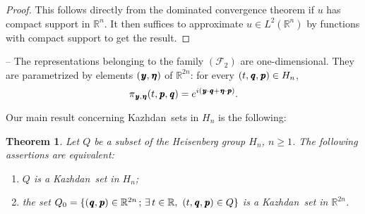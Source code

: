 \documentclass[11pt,english,a4paper]{smfart}
\numberwithin{equation}{section}
\newtheorem{theorem}{Theorem}[section]
\theoremstyle{definition}
\begin{document}
\begin{proof}
 This follows directly from the dominated convergence theorem if $u$ has compact support in ${\ensuremath{\mathbb R}}^{n}$. It then suffices to approximate $u\in L^{2}({\ensuremath{\mathbb R}}^{n})$ by functions with compact support to get the result.
\end{proof}
\par\smallskip 
-- The representations belonging to the family $(\mathcal{F}_{2})$ are one-dimensional. They are parametrized by elements $({\mkern 1.5 mu\pmb{y}},{\mkern 1.5 mu\pmb{\eta}} )$ of ${\ensuremath{\mathbb R}}^{2n}$: for every $(t,{\mkern 1.5 mu\pmb{q}},{\mkern 1.5 mu\pmb{p}})\in H_{n}$,
\[
\pi _{{\mkern 1.5 mu\pmb{y}},{\mkern 1.5 mu\pmb{\eta}} }(t,{\mkern 1.5 mu\pmb{p}},{\mkern 1.5 mu\pmb{q}})=e^{i({\mkern 1.5 mu\pmb{y}}\cdot{\mkern 1.5 mu\pmb{q}}+{\mkern 1.5 mu\pmb{\eta}}\cdot {\mkern 1.5 mu\pmb{p}})}.
\]
\par\smallskip 
Our main result concerning {Kazhdan}\ sets in $H_{n}$ is the following:

\begin{theorem}\label{Proposition F}
 Let ${Q}$ be a subset of the Heisenberg group $H_{n}$, $n\geq 1$. The following assertions are equivalent:
\begin{enumerate}
 \item [(1)] ${Q}$ is a {Kazhdan}\ set in $H_{n}$;
\item[(2)] the set ${Q}_{0}=\{({\mkern 1.5 mu\pmb{q}},{\mkern 1.5 mu\pmb{p}})\in{\ensuremath{\mathbb R}}^{2n}\,;\,\exists\,t\in{\ensuremath{\mathbb R}},\ (t,{\mkern 1.5 mu\pmb{q}},{\mkern 1.5 mu\pmb{p}})\in{Q}\}$ is a {Kazhdan}\ set in ${\ensuremath{\mathbb R}}^{2n}$.
\end{enumerate}
\end{theorem}
\end{document}
